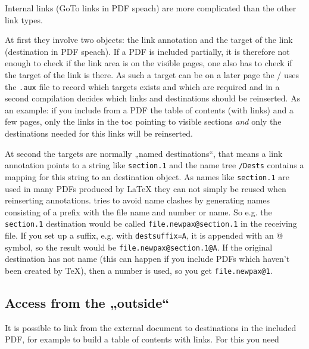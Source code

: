 \documentclass[DIV=12,parskip=half-,bibliography=totoc]{scrartcl}
\begin{document}
Internal links (GoTo links in PDF speach) are more complicated than the other link types.

At first they involve two objects: the link annotation and the target of the link (destination in PDF speach). If a PDF is included partially, it is therefore not enough to check if the link area is on the visible pages, one also has to check if the target of the link is there. As such a target can be on a later page the / uses the \texttt{.aux} file to record which targets exists and which are required and in a second compilation decides which links and destinations should be reinserted. As an example: if you include from a PDF the table of contents (with links) and a few pages, only the links in the toc pointing to visible sections \emph{and} only the destinations needed for this links will be reinserted.

At second the targets are normally „named destinations“, that means a link 
annotation points to a string like \texttt{section.1} and the name tree  
\texttt{/Dests} contains a mapping for this string to an destination object. 
As names like \texttt{section.1} are used in many PDFs produced by \LaTeX{} 
they can not simply be reused when reinserting annotations.  
tries to avoid name clashes by generating names consisting of a prefix with 
the file name and number or name. So e.g. the \texttt{section.1} destination 
would be called \texttt{file.newpax@section.1} in the receiving file. If you 
set up a suffix, e.g. with \texttt{destsuffix=A}, it is appended with an @ 
symbol, so the result would be \texttt{file.newpax@section.1@A}. If the 
original destination has not name (this can happen if you include PDFs which 
haven't been created by TeX), then a number is used, so you get 
\texttt{file.newpax@1}. 


\subsection{Access from the „outside“}\label{sec:outside}

It is possible to link from the external document to destinations in the 
included PDF, for example to build a table of contents with links. For this 
you need  
\end{document}
